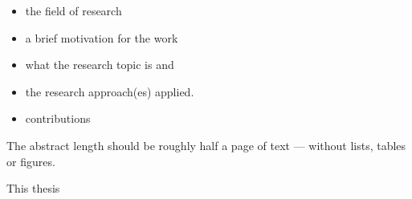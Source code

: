 \begin{itemize}
\item the field of research
\item a brief motivation for the work
\item what the research topic is and
\item the research approach(es) applied. 
\item contributions
\end{itemize}

The abstract length should be roughly half a page of text --- without lists, tables or figures.  


This thesis 